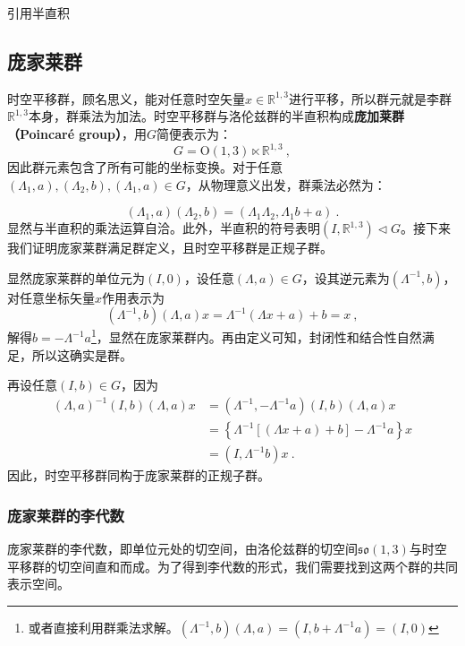 

\begin{issues}
\issueTODO 引用半直积
\end{issues}


\subsection{庞家莱群}
时空平移群，顾名思义，能对任意时空矢量$x\in \mathbb R^{1,3} $进行平移，所以群元就是李群$\mathbb R^{1,3}$本身，群乘法为加法。时空平移群与洛伦兹群的半直积构成\textbf{庞加莱群（Poincaré group）}，用$G$简便表示为：
\begin{equation}
G= \mathrm{O}(1,3) \ltimes\mathbb{R}^{1,3}~,
\end{equation}
因此群元素包含了所有可能的坐标变换。对于任意$(\Lambda_1,a),(\Lambda_2,b),(\Lambda_1,a)\in G$，从物理意义出发，群乘法必然为：

\begin{equation}
(\Lambda_1,a)(\Lambda_2,b)=(\Lambda_1\Lambda_2,\Lambda_1b+a)~.
\end{equation}
显然与半直积的乘法运算自洽。此外，半直积的符号表明$(I,\mathbb R^{1,3})\vartriangleleft G$。接下来我们证明庞家莱群满足群定义，且时空平移群是正规子群。

显然庞家莱群的单位元为$(I,0)$，设任意$(\Lambda,a)\in G$，设其逆元素为$(\Lambda^{-1},b)$，对任意坐标矢量$x$作用表示为
\begin{equation}
(\Lambda^{-1},b)(\Lambda,a)x=\Lambda^{-1}(\Lambda x+a)+b=x~,
\end{equation}
解得$b=-\Lambda^{-1} a$\footnote{或者直接利用群乘法求解。$(\Lambda^{-1},b)(\Lambda,a)=(I,b+\Lambda^{-1}a)=(I,0)$}，显然在庞家莱群内。再由定义可知，封闭性和结合性自然满足，所以这确实是群。

再设任意$(I,b)\in G$，因为
\begin{equation}
\begin{aligned}
(\Lambda,a)^{-1}(I,b)(\Lambda,a)x&=(\Lambda^{-1},-\Lambda^{-1}a)(I,b)(\Lambda,a)x\\
&=\left\{\Lambda^{-1}\left [\left(\Lambda x+a \right)+b\right]-\Lambda^{-1}a\right\}x\\
&=(I,\Lambda^{-1}b)x~.
\end{aligned}
\end{equation}
因此，时空平移群同构于庞家莱群的正规子群。



\subsubsection{庞家莱群的李代数}
庞家莱群的李代数，即单位元处的切空间，由洛伦兹群的切空间$\mathfrak {so}(1,3)$与时空平移群的切空间直和而成。为了得到李代数的形式，我们需要找到这两个群的共同表示空间。

